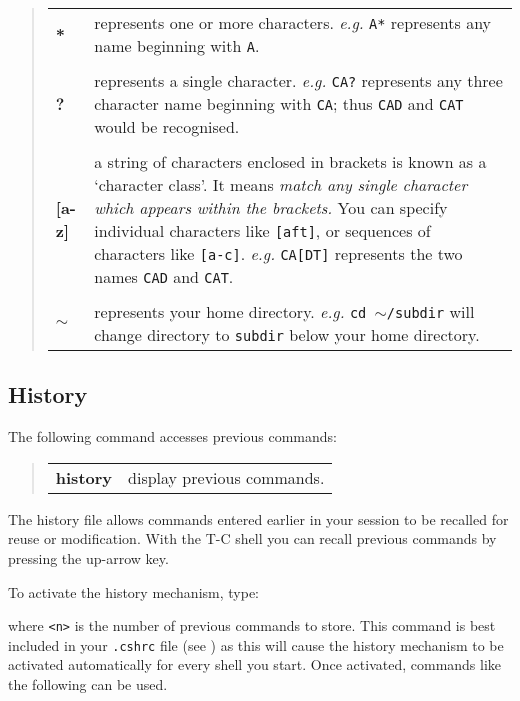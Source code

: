 \documentclass[twoside,11pt,nolof]{starlink}
\begin{document}
\begin{quote}
\begin{tabular}{lp{77mm}}

\textbf{*}  & represents one or more characters. \emph{e.g.}\/ \texttt{A*}
  represents any name beginning with \texttt{A}.\\
\\
\textbf{?}  & represents a single character.  \emph{e.g.}\/ \texttt{CA?}
  represents any three character name beginning with \texttt{CA}; thus \texttt{CAD}
  and \texttt{CAT} would be recognised.\\
\\
\textbf{[a-z]}   & a string of characters enclosed in brackets is known as a
  `character class'.  It means \emph{match any single character which appears
  within the brackets.}  You can specify individual characters like
  \texttt{[aft]}, or sequences of   characters like \texttt{[a-c]}.  \emph{e.g.}\/
  \texttt{CA[DT]} represents the two names \texttt{CAD} and \texttt{CAT}.\\
\\
\textbf{$\sim$}   & represents your home directory.  \emph{e.g.}\/ \texttt{cd
  \textbf{$\sim$}/subdir} will change directory to \texttt{subdir} below your home
  directory.

\end{tabular}
\end{quote}


\subsection{History}

The following command accesses previous commands:
\begin{quote}
\begin{tabular}{lp{67mm}}

\textbf{history}  & display previous commands.

\end{tabular}
\end{quote}
The history file allows commands entered earlier in your session to be recalled
for reuse or modification.
With the T-C shell you can recall previous commands by pressing the
up-arrow key.

To activate the history mechanism, type:
\begin{terminalv}
\end{terminalv}
where \texttt{<n>} is the number of previous commands to store.
This command is best included in your \texttt{.cshrc} file
(see )
as this will cause the history mechanism to be
activated automatically for every shell you start.
Once activated, commands like the following can be used.
\end{document}
